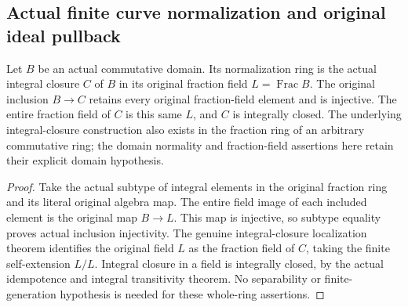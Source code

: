 \subsection{Actual finite curve normalization and original ideal pullback}
\label{subsec:finite-curve-normalization}

\begin{definition}
\label{algebra:actual-curve-normalization-ring}
\leanok
Let $B$ be an actual commutative domain. Its normalization ring is the
actual integral closure $C$ of $B$ in its original fraction field
$L=\operatorname{Frac}B$. The original inclusion $B\to C$ retains every
original fraction-field element and is injective. The entire fraction
field of $C$ is this same $L$, and $C$ is integrally closed.
The underlying integral-closure construction also exists in the fraction
ring of an arbitrary commutative ring; the domain normality and
fraction-field assertions here retain their explicit domain hypothesis.
\end{definition}
\begin{proof}
Take the actual subtype of integral elements in the original fraction
ring and its literal original algebra map. The entire field image of
each included element is the original map $B\to L$. This map is
injective, so subtype equality proves actual inclusion injectivity.
The genuine integral-closure localization theorem identifies the
original field $L$ as the fraction field of $C$, taking the finite
self-extension $L/L$. Integral closure in a field is integrally closed,
by the actual idempotence and integral transitivity theorem. No
separability or finite-generation hypothesis is needed for these
whole-ring assertions.
\end{proof}

